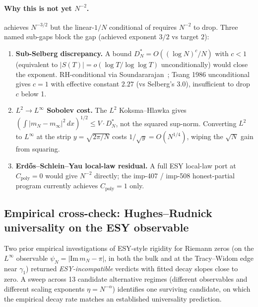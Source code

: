 \documentclass[11pt,a4paper]{article}
\theoremstyle{definition}
\begin{document}
\paragraph{Why this is not yet $N^{-2}$.}
 achieves $N^{-3/2}$ but the linear-$1/N$ conditional of
 requires $N^{-2}$ to drop. Three named sub-gaps
block the gap (achieved exponent $3/2$ vs target $2$):
\begin{enumerate}
\item \textbf{Sub-Selberg discrepancy.} A bound
$D_N^* = O((\log N)^c / N)$ with $c < 1$ (equivalent to
$|S(T)| = o(\log T / \log\log T)$ unconditionally) would close the
exponent. RH-conditional via Soundararajan~\cite{Soundararajan2009}; Tsang
1986 unconditional gives $c = 1$ with effective constant $2.27$ (vs
Selberg's $3.0$), insufficient to drop $c$ below 1.
\item \textbf{$L^2 \to L^\infty$ Sobolev cost.}
The $L^2$ Koksma--Hlawka gives
$(\int |m_N - m_\infty|^2\,dx)^{1/2} \le V \cdot D_N^*$, not the squared
sup-norm. Converting $L^2$ to $L^\infty$ at the strip $y = \sqrt{2\pi/N}$
costs $1/\sqrt{y} = O(N^{1/4})$, wiping the $\sqrt{N}$ gain from squaring.
\item \textbf{Erd\H{o}s--Schlein--Yau local-law residual.}
A full ESY local-law port at $C_{\mathrm{poly}} = 0$ would give $N^{-2}$
directly; the imp-407 / imp-508 honest-partial program currently
achieves $C_{\mathrm{poly}} = 1$ only.
\end{enumerate}

\subsection{Empirical cross-check: Hughes--Rudnick universality on the ESY observable}\label{sec:esy-positive}

Two prior empirical investigations of ESY-style rigidity for Riemann
zeros (on the $L^\infty$ observable $\psi_N = |\mathrm{Im}\,m_N - \pi|$,
in both the bulk and at the Tracy--Widom edge near $\gamma_1$) returned
\emph{ESY-incompatible} verdicts with fitted decay slopes close to zero.
A sweep across 13 candidate alternative regimes (different observables
and different scaling exponents $\eta = N^{-\alpha}$) identifies one
surviving candidate, on which the empirical decay rate matches an
established universality prediction.
\end{document}
